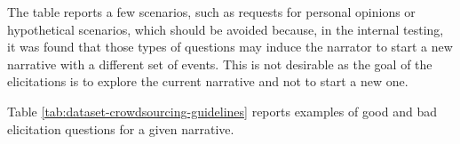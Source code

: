 The table reports a few scenarios, such as requests for personal opinions or hypothetical scenarios, which should be avoided because, in the internal testing, it was found that those types of questions may induce the narrator to start a new narrative with a different set of events. This is not desirable as the goal of the elicitations is to explore the current narrative and not to start a new one.

Table \ref{tab:dataset-crowdsourcing-guidelines} reports examples of good and bad elicitation questions for a given narrative. 

